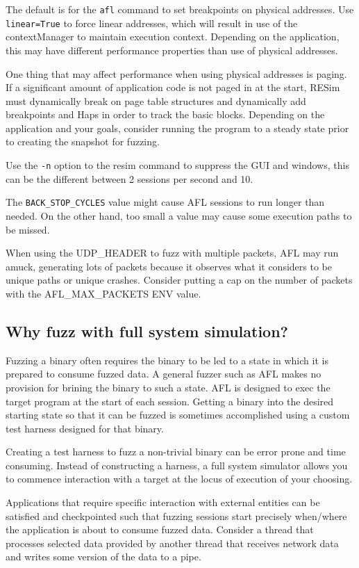 \documentclass[titlepage]{article}
\begin{document}
The default is for the {\tt afl} command to set breakpoints on physical addresses.  Use {\tt linear=True} to force linear addresses, which will
result in use of the contextManager to maintain execution context.  Depending on the application, this may have different performance properties than 
use of physical addresses.  

One thing that may affect performance when using physical addresses is paging. If a significant amount of application code is not paged in at the
start, RESim must dynamically break on page table structures and dynamically add breakpoints and Haps in order to track the basic blocks.  Depending on
the  application and your goals, consider running the program to a steady state prior to creating the snapshot for fuzzing.

Use the {\tt -n} option to the resim command to suppress the GUI and windows, this can be the different between 2 sessions per second and 10.

The {\tt BACK\_STOP\_CYCLES} value might cause AFL sessions to run longer than needed.  On the other hand, too small a value may cause some
execution paths to be missed.

When using the UDP\_HEADER to fuzz with multiple packets, AFL may run amuck, generating lots of packets because it observes what it considers
to be unique paths or unique crashes.  Consider putting a cap on the number of packets with the AFL\_MAX\_PACKETS ENV value. 


\subsection{Why fuzz with full system simulation?}
Fuzzing a binary often requires the binary to be led to a state in which it is prepared
to consume fuzzed data. A general fuzzer such as AFL makes no provision for brining the 
binary to such a state.  AFL is designed to exec the target program at the start of each
session.  Getting a binary into the desired starting state so that it can be fuzzed is
sometimes accomplished using a custom test harness designed for that binary.

Creating a test harness to fuzz a non-trivial binary can be error prone and time consuming.
Instead of constructing a harness, a full system simulator allows you to commence interaction
with a target at the locus of execution of your choosing.

Applications that require specific interaction with external entities can be satisfied and checkpointed
such that fuzzing sessions start precisely when/where the application is about to consume fuzzed data.
Consider a thread that processes selected data provided by another thread that receives network data
and writes some version of the data to a pipe.
\end{document}
